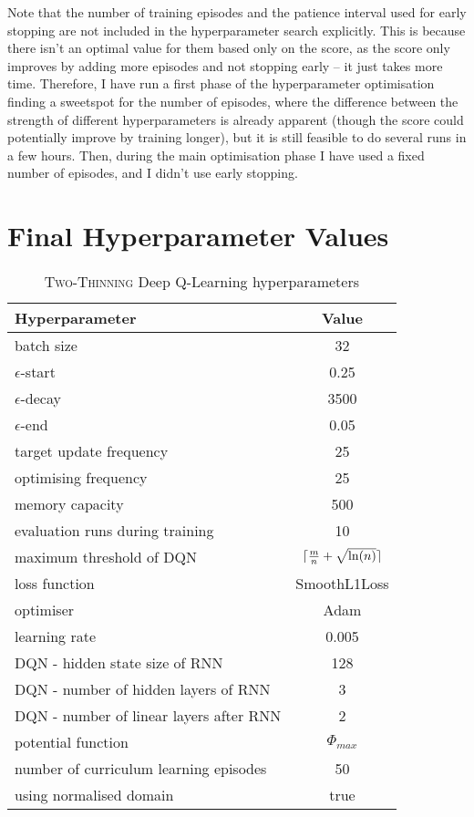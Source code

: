 Note that the number of training episodes and the patience interval used for early stopping are not included in the hyperparameter search explicitly. This is because there isn't an optimal value for them based only on the score, as the score only improves by adding more episodes and not stopping early -- it just takes more time. Therefore, I have run a first phase of the hyperparameter optimisation finding a sweetspot for the number of episodes, where the difference between the strength of different hyperparameters is already apparent (though the score could potentially improve by training longer), but it is still feasible to do several runs in a few hours. Then, during the main optimisation phase I have used a fixed number of episodes, and I didn't use early stopping.


\section*{Final Hyperparameter Values}



\begin{table}[h]
\begin{threeparttable}
\centering
\begin{tabular}{l|c}
\toprule
Hyperparameter             &     Value \\
\midrule
batch size               &     32 \\ 
$\epsilon$-start               &    0.25 \\ 
$\epsilon$-decay         &     3500\\
$\epsilon$-end              &     0.05 \\
target update frequency               &     25 \\ 
optimising frequency          &     25 \\ 
memory capacity     &     500 \\
evaluation runs during training             &     10 \\
maximum threshold of DQN             &     $\lceil\frac{m}{n}+\sqrt{\ln(n)}\rceil$ \\ 
loss function               &     SmoothL1Loss \\ 
optimiser        &     Adam \\
learning rate             &     0.005 \\
DQN - hidden state size of RNN               &     128 \\ 
DQN - number of hidden layers of RNN         &     3 \\ 
DQN - number of linear layers after RNN     &     2 \\
potential function            &    $\Phi_{max}$ \\
number of curriculum learning episodes            & 50 \\ 
using normalised domain               &     true \\ 
\bottomrule
\end{tabular}
\end{threeparttable}
\caption{\textsc{Two-Thinning} Deep Q-Learning hyperparameters\protect\footnotemark}
\label{tab:two-thinning-hyperparameters}
\end{table}

